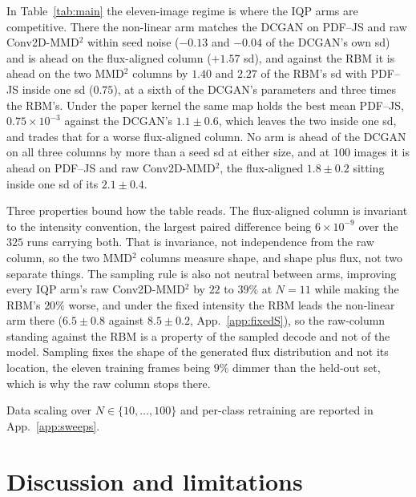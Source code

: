 \documentclass{article}
\begin{document}
In Table~\ref{tab:main} the eleven-image regime is where the IQP arms are competitive. There the
non-linear arm matches the DCGAN on PDF--JS and raw Conv2D-MMD$^2$ within seed noise ($-0.13$ and
$-0.04$ of the DCGAN's own sd) and is ahead on the flux-aligned column ($+1.57$ sd), and against the
RBM it is ahead on the two MMD$^2$ columns by $1.40$ and $2.27$ of the RBM's sd with PDF--JS inside
one sd ($0.75$), at a sixth of the DCGAN's parameters and three times the RBM's. Under the paper
kernel the same map holds the best mean PDF--JS, $0.75 \times 10^{-3}$ against the DCGAN's
$1.1 \pm 0.6$, which leaves the two inside one sd, and trades that for a worse flux-aligned column.
No arm is ahead of the DCGAN on all three columns by more than a seed sd at either size, and at $100$
images it is ahead on PDF--JS and raw Conv2D-MMD$^2$, the flux-aligned $1.8 \pm 0.2$ sitting inside
one sd of its $2.1 \pm 0.4$.

Three properties bound how the table reads. The flux-aligned column is invariant to the intensity
convention, the largest paired difference being $6\times10^{-9}$ over the $325$ runs carrying both.
That is invariance, not independence from the raw column, so the two MMD$^2$ columns measure shape,
and shape plus flux, not two separate things. The sampling rule is also not
neutral between arms, improving every IQP arm's raw Conv2D-MMD$^2$ by $22$ to $39\%$ at $N{=}11$
while making the RBM's $20\%$ worse, and under the fixed intensity the RBM leads the non-linear arm
there ($6.5 \pm 0.8$ against $8.5 \pm 0.2$, App.~\ref{app:fixedS}), so the raw-column
standing against the RBM is a property of the sampled decode and not of the model. Sampling fixes the
shape of the generated flux distribution and not its location, the eleven training frames being $9\%$
dimmer than the held-out set, which is why the raw column stops there.

Data scaling over $N \in \{10,\dots,100\}$ and per-class retraining are reported in
App.~\ref{app:sweeps}.

\section{Discussion and limitations}
\label{sec:disc}
\end{document}
